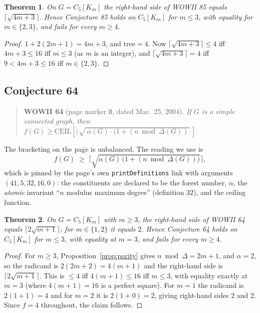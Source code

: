 \documentclass[10pt,a4paper]{article}
\theoremstyle{plain}
\newtheorem{theorem}{Theorem}[section]
\theoremstyle{definition}
\newcommand{\ind}{\alpha}
\newcommand{\forestnum}{f}
\newcommand{\treenum}{\mathrm{tree}}
\newcommand{\blow}[2]{#1[K_{#2}]}
\begin{document}
\begin{theorem}\label{thm:85}
On $G = \blow{C_5}{m}$ the right-hand side of WOWII 85 equals $\lceil \sqrt{4m+3} \rceil$.
Hence Conjecture 85 holds on $\blow{C_5}{m}$ for $m \le 3$, with equality for
$m \in \{2,3\}$, and fails for every $m \ge 4$.
\end{theorem}

\begin{proof}
$1 + 2(2m+1) = 4m+3$, and $\treenum = 4$. Now $\lceil\sqrt{4m+3}\rceil \le 4$ iff
$4m + 3 \le 16$ iff $m \le 3$ (as $m$ is an integer), and $\lceil\sqrt{4m+3}\rceil = 4$ iff
$9 < 4m+3 \le 16$ iff $m \in \{2,3\}$.
\end{proof}

\subsection{Conjecture 64}\label{sec:c64}

\begin{quote}
\textbf{WOWII 64} (page marker \texttt{O}, dated Mar.\ 25, 2004). \emph{If $G$ is a simple
connected graph, then} $\forestnum(G) \ge \mathrm{CEIL}[(\sqrt{\,\ind(G) \cdot (1 + (n \bmod
\Delta(G))\,}\,]$.
\end{quote}

The bracketing on the page is unbalanced. The reading we use is
\[
\forestnum(G) \;\ge\; \Big\lceil \sqrt{\ind(G)\,\big(1 + (n \bmod \Delta(G))\big)} \Big\rceil ,
\]
which is pinned by the page's own \texttt{printDefinitions} link with arguments
$(41,5,32,16,0)$: the constituents are declared to be the forest number, $\ind$, the
\emph{atomic} invariant ``$n$ modulus maximum degree'' (definition $32$), and the ceiling
function.

\begin{theorem}\label{thm:64}
On $G = \blow{C_5}{m}$ with $m \ge 3$, the right-hand side of WOWII 64 equals
$\lceil 2\sqrt{m+1} \rceil$; for $m \in \{1,2\}$ it equals $2$. Hence Conjecture 64 holds on
$\blow{C_5}{m}$ for $m \le 3$, with equality at $m = 3$, and fails for every $m \ge 4$.
\end{theorem}

\begin{proof}
For $m \ge 3$, Proposition~\ref{prop:parity} gives $n \bmod \Delta = 2m+1$, and
$\ind = 2$, so the radicand is $2(2m+2) = 4(m+1)$ and the right-hand side is
$\lceil 2\sqrt{m+1}\rceil$. This is $\le 4$ iff $4(m+1) \le 16$ iff $m \le 3$, with equality
exactly at $m = 3$ (where $4(m+1) = 16$ is a perfect square). For $m = 1$ the radicand is
$2(1+1) = 4$ and for $m = 2$ it is $2(1+0) = 2$, giving right-hand sides $2$ and $2$. Since
$\forestnum = 4$ throughout, the claim follows.
\end{proof}
\end{document}
